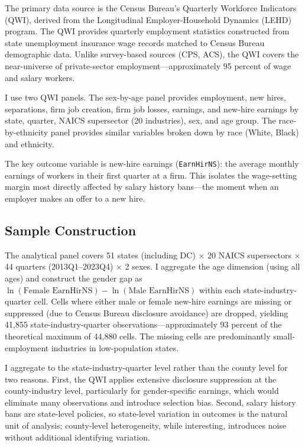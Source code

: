 \documentclass[12pt]{article}
\begin{document}
The primary data source is the Census Bureau's Quarterly Workforce Indicators (QWI), derived from the Longitudinal Employer-Household Dynamics (LEHD) program. The QWI provides quarterly employment statistics constructed from state unemployment insurance wage records matched to Census Bureau demographic data. Unlike survey-based sources (CPS, ACS), the QWI covers the near-universe of private-sector employment---approximately 95 percent of wage and salary workers.

I use two QWI panels. The sex-by-age panel provides employment, new hires, separations, firm job creation, firm job losses, earnings, and new-hire earnings by state, quarter, NAICS supersector (20 industries), sex, and age group. The race-by-ethnicity panel provides similar variables broken down by race (White, Black) and ethnicity.

The key outcome variable is new-hire earnings (\texttt{EarnHirNS}): the average monthly earnings of workers in their first quarter at a firm. This isolates the wage-setting margin most directly affected by salary history bans---the moment when an employer makes an offer to a new hire.

\subsection{Sample Construction}

The analytical panel covers 51 states (including DC) $\times$ 20 NAICS supersectors $\times$ 44 quarters (2013Q1--2023Q4) $\times$ 2 sexes. I aggregate the age dimension (using all ages) and construct the gender gap as $\ln(\text{Female EarnHirNS}) - \ln(\text{Male EarnHirNS})$ within each state-industry-quarter cell. Cells where either male or female new-hire earnings are missing or suppressed (due to Census Bureau disclosure avoidance) are dropped, yielding 41,855 state-industry-quarter observations---approximately 93 percent of the theoretical maximum of 44,880 cells. The missing cells are predominantly small-employment industries in low-population states.

I aggregate to the state-industry-quarter level rather than the county level for two reasons. First, the QWI applies extensive disclosure suppression at the county-industry level, particularly for gender-specific earnings, which would eliminate many observations and introduce selection bias. Second, salary history bans are state-level policies, so state-level variation in outcomes is the natural unit of analysis; county-level heterogeneity, while interesting, introduces noise without additional identifying variation.
\end{document}
